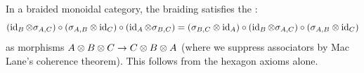 \documentclass[../preamble]{subfiles}
\begin{document}
\begin{remark}
  \label{rem:yang-baxter}
  In a braided monoidal category,
  the braiding satisfies the
  :
  \begin{equation}
    \label{eq:yang-baxter}
    (\operatorname{id}_B \otimes \sigma_{A,C})
    \circ (\sigma_{A,B} \otimes \operatorname{id}_C)
    \circ (\operatorname{id}_A \otimes \sigma_{B,C})
    =
    (\sigma_{B,C} \otimes \operatorname{id}_A)
    \circ (\operatorname{id}_B \otimes \sigma_{A,C})
    \circ (\sigma_{A,B} \otimes \operatorname{id}_C)
  \end{equation}
  as morphisms
  $A \otimes B \otimes C \lto C \otimes B \otimes A$
  (where we suppress associators by Mac Lane's coherence theorem).
  This follows from the hexagon axioms alone.
\end{remark}
\end{document}
